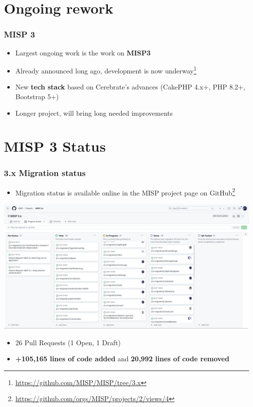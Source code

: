 \section{Ongoing rework}

\begin{frame}
  \frametitle{MISP 3}
  \begin{itemize}
     \item Largest ongoing work is the work on {\bf MISP3}
     \item Already announced long ago, development is now underway\footnote{\url{https://github.com/MISP/MISP/tree/3.x}}
     \item New {\bf tech stack} based on Cerebrate's advances (CakePHP 4.x+, PHP 8.2+, Bootstrap 5+)
     \item Longer project, will bring long needed improvements
  \end{itemize}
\end{frame}

\section{MISP 3 Status}

\begin{frame}
	\frametitle{3.x Migration status}
	\begin{itemize}
	\item Migration status is available online in the MISP project page on GitHub\footnote{\url{https://github.com/orgs/MISP/projects/2/views/4}}
	\end{itemize}
	\begin{center}
		\includegraphics[scale=0.12]{misp3-project.png}
	\end{center}
	\begin{itemize}
		\item 26 Pull Requests (1 Open, 1 Draft)
		\item {\bf +105,165 lines of code added} and {\bf 20,992 lines of code removed}
	\end{itemize}
\end{frame}

